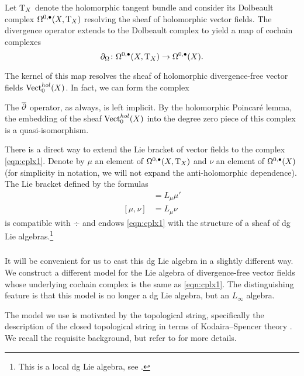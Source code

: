 \documentclass[11pt]{amsart}
\begin{document}
Let ${\rm T}_X$ denote the holomorphic tangent bundle and consider its Dolbeault complex $\Omega^{0,\bullet}(X , {\rm T}_X)$ resolving the sheaf of holomorphic vector fields. 
The divergence operator extends to the Dolbeault complex to yield a map of cochain complexes 
\[
\partial_{\Omega} \colon \Omega^{0,\bullet}(X , {\rm T}_X) \to \Omega^{0,\bullet}(X) .
\]

The kernel of this map resolves the sheaf of holomorphic divergence-free vector fields ${\rm Vect}_0^{hol}(X)$.
In fact, we can form the complex 
\beqn\label{eqn:cplx1}
\eeqn
The $\overline{\partial}$ operator, as always, is left implicit. 
By the holomorphic Poincar\'e lemma, the embedding of the sheaf ${\rm Vect}^{hol}_0(X)$ into the degree zero piece of this complex is a quasi-isomorphism. 

There is a direct way to extend the Lie bracket of vector fields to the complex \eqref{eqn:cplx1}. 
Denote by $\mu$ an element of $\Omega^{0,\bullet}(X , {\rm T}_X)$ and $\nu$ an element of $\Omega^{0,\bullet}(X)$ (for simplicity in notation, we will not expand the anti-holomorphic dependence). 
The Lie bracket defined by the formulas
\begin{align*}
[\mu, \mu'] & = L_\mu \mu' \\
[\mu, \nu] & = L_\mu \nu 
\end{align*}
is compatible with $\div$ and endows \eqref{eqn:cplx1} with the structure of a sheaf of dg Lie algebras.\footnote{This is a local dg Lie algebra, see \cite[??]{CG2}.}

\subsubsection{}
It will be convenient for us to cast this dg Lie algebra in a slightly different way.
We construct a different model for the Lie algebra of divergence-free vector fields whose underlying cochain complex is the same as \eqref{eqn:cplx1}. 
The distinguishing feature is that this model is no longer a dg Lie algebra, but an $L_\infty$ algebra. 

The model we use is motivated by the topological string, specifically the description of the closed topological string in terms of Kodaira--Spencer theory \cite{BCOV}.
We recall the requisite background, but refer to \cite{CLbcov1,CLbcov2,CLtypeI} for more details. 
\end{document}

